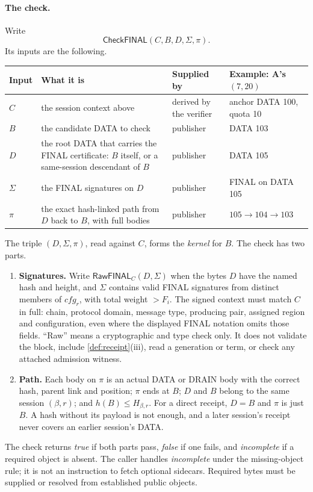 \documentclass[11pt,a4paper]{article}
\newcommand{\tagg}[1]{\ensuremath{\mathsf{#1}}}
\newcommand{\defterm}[1]{\textcolor{rrBlue}{\textit{#1}}}
\newcounter{protocol}
\begin{document}
\paragraph{The check.}
Write
\[
 \tagg{CheckFINAL}(C,B,D,\Sigma,\pi).
\]
Its inputs are the following.
\begin{center}\small
\begin{tabularx}{\linewidth}{@{}>{\raggedright\arraybackslash}p{.05\linewidth}Y>{\raggedright\arraybackslash}p{.15\linewidth}>{\raggedright\arraybackslash}p{.22\linewidth}@{}}\toprule
Input & What it is & Supplied by & Example: A's $(7,20)$\\\midrule
$C$ & the session context above & derived by the verifier & anchor DATA 100, quota 10\\
$B$ & the candidate DATA to check & publisher & DATA 103\\
$D$ & the root DATA that carries the FINAL certificate: $B$ itself, or a same-session descendant of $B$ & publisher & DATA 105\\
$\Sigma$ & the FINAL signatures on $D$ & publisher & FINAL on DATA 105\\
$\pi$ & the exact hash-linked path from $D$ back to $B$, with full bodies & publisher & $105\to104\to103$\\\bottomrule
\end{tabularx}
\end{center}
The triple $(D,\Sigma,\pi)$, read against $C$, forms the \defterm{kernel} for $B$.
The check has two parts.
\begin{enumerate}[label=(\arabic*),itemsep=2pt]
\item \textbf{Signatures.} Write $\tagg{RawFINAL}_C(D,\Sigma)$ when the
bytes $D$ have the named hash and height, and $\Sigma$ contains valid
FINAL signatures from distinct members of $\mathit{cfg}_r$, with total
weight $>F_i$. The signed context must match $C$ in full: chain,
protocol domain, message type, producing pair, assigned region and
configuration, even where the displayed FINAL notation omits those
fields. ``Raw'' means a cryptographic and type check only. It does not
validate the block, include \cref{def:receipt}(iii), read a generation
or term, or check any attached admission witness.
\item \textbf{Path.} Each body on $\pi$ is an actual DATA or DRAIN body
with the correct hash, parent link and position; $\pi$ ends at $B$; $D$
and $B$ belong to the same session $(\beta,r)$; and
$h(B)\le H_{\beta,r}$. For a direct receipt, $D=B$ and $\pi$ is just $B$.
A hash without its payload is not enough, and a later session's receipt
never covers an earlier session's DATA.
\end{enumerate}
The check returns \emph{true} if both parts pass, \emph{false} if one
fails, and \emph{incomplete} if a required object is absent. The caller
handles \emph{incomplete} under the missing-object rule; it is not an
instruction to fetch optional sidecars. Required bytes must be supplied
or resolved from established public objects.
\end{document}
